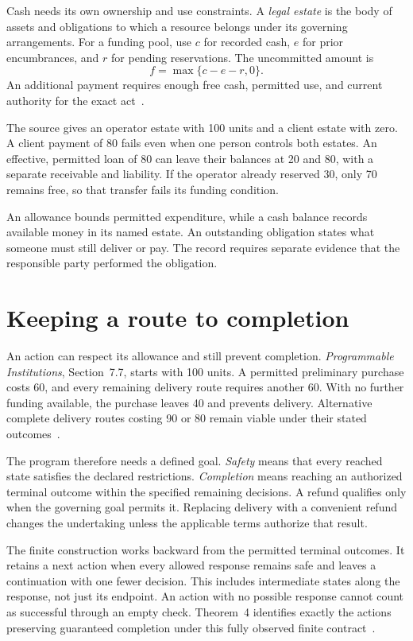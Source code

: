 \documentclass{momentum}
\begin{document}
Cash needs its own ownership and use constraints.
A \emph{legal estate} is the body of assets and obligations to which a resource belongs under its governing arrangements.
For a funding pool, use \(c\) for recorded cash, \(e\) for prior encumbrances, and \(r\) for pending reservations.
The uncommitted amount is
\[
f=\max\{c-e-r,0\}.
\]
An additional payment requires enough free cash, permitted use, and current authority for the exact act~\cite[Section~2, ``Estate-specific funding'']{entity}.

The source gives an operator estate with 100 units and a client estate with zero.
A client payment of 80 fails even when one person controls both estates.
An effective, permitted loan of 80 can leave their balances at 20 and 80, with a separate receivable and liability.
If the operator already reserved 30, only 70 remains free, so that transfer fails its funding condition.

An allowance bounds permitted expenditure, while a cash balance records available money in its named estate.
An outstanding obligation states what someone must still deliver or pay.
The record requires separate evidence that the responsible party performed the obligation.

\section{Keeping a route to completion}
\label{sec:completion}

An action can respect its allowance and still prevent completion.
\emph{Programmable Institutions}, Section~7.7, starts with 100 units.
A permitted preliminary purchase costs 60, and every remaining delivery route requires another 60.
With no further funding available, the purchase leaves 40 and prevents delivery.
Alternative complete delivery routes costing 90 or 80 remain viable under their stated outcomes~\cite[Section~7.7]{institutions}.

The program therefore needs a defined goal.
\emph{Safety} means that every reached state satisfies the declared restrictions.
\emph{Completion} means reaching an authorized terminal outcome within the specified remaining decisions.
A refund qualifies only when the governing goal permits it.
Replacing delivery with a convenient refund changes the undertaking unless the applicable terms authorize that result.

The finite construction works backward from the permitted terminal outcomes.
It retains a next action when every allowed response remains safe and leaves a continuation with one fewer decision.
This includes intermediate states along the response, not just its endpoint.
An action with no possible response cannot count as successful through an empty check.
Theorem~4 identifies exactly the actions preserving guaranteed completion under this fully observed finite contract~\cite[Section~7.7]{institutions}.
\end{document}
